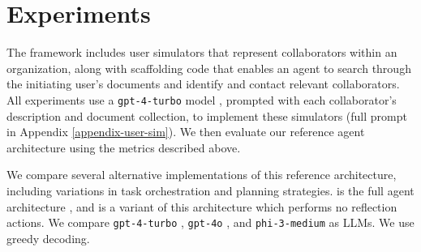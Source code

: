 

\section{Experiments}

The \asyncfw{} framework includes user simulators that represent collaborators within an organization, along with scaffolding code that enables an agent to search through the initiating user's documents and identify and contact relevant collaborators.
All experiments use a \texttt{gpt-4-turbo} model \citep{openai2023gpt4}, prompted with each collaborator's description and document collection, to implement these simulators (full prompt in Appendix \ref{appendix-user-sim}). We then evaluate our reference agent architecture using the metrics described above.



We compare several alternative implementations of this reference architecture, including variations in task orchestration and planning strategies. 
\textbf{\reactagent{}} is the full agent architecture
\cite{DBLP:conf/iclr/YaoZYDSN023}, and
\textbf{\noreflectionagent{}} is a variant of this architecture which performs no reflection actions.
We compare \texttt{gpt-4-turbo} \cite{openai2023gpt4}, \texttt{gpt-4o} \cite{openai2023gpt4}, and \texttt{phi-3-medium} \cite{abdin2024phi} as LLMs.
We use greedy decoding.




